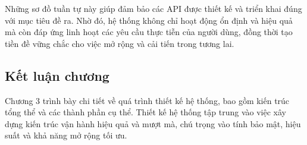 Những sơ đồ tuần tự này giúp đảm bảo các API được thiết kế và triển khai đúng với mục tiêu đề ra.
Nhờ đó, hệ thống không chỉ hoạt động ổn định và hiệu quả mà còn đáp ứng linh hoạt các yêu cầu thực tiễn của người dùng,
đồng thời tạo tiền đề vững chắc cho việc mở rộng và cải tiến trong tương lai.

\subsection{Kết luận chương}

Chương 3 trình bày chi tiết về quá trình thiết kế hệ thống, bao gồm kiến trúc tổng thể và các thành phần cụ thể.
Thiết kế hệ thống tập trung vào việc xây dựng kiến trúc vận hành hiệu quả và mượt mà, chú trọng vào tính bảo mật, hiệu suất và khả năng mở rộng tối ưu.
\newpage